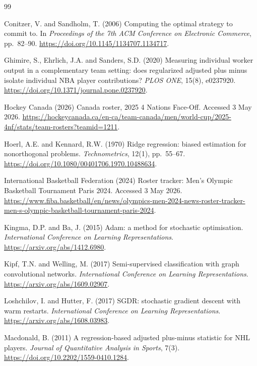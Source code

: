\documentclass[12pt,letterpaper]{article}
\begin{document}
\begin{thebibliography}{99}

Conitzer, V. and Sandholm, T. (2006)
Computing the optimal strategy to commit to.
In \textit{Proceedings of the 7th ACM Conference on Electronic
Commerce}, pp.\ 82--90.
\url{https://doi.org/10.1145/1134707.1134717}.

Ghimire, S., Ehrlich, J.A. and Sanders, S.D. (2020)
Measuring individual worker output in a complementary team setting:
does regularized adjusted plus minus isolate individual NBA player
contributions?
\textit{PLOS ONE}, 15(8), e0237920.
\url{https://doi.org/10.1371/journal.pone.0237920}.

Hockey Canada (2026)
Canada roster, 2025 4 Nations Face-Off.
Accessed 3 May 2026.
\url{https://hockeycanada.ca/en-ca/team-canada/men/world-cup/2025-4nf/stats/team-rosters?teamid=1211}.

Hoerl, A.E. and Kennard, R.W. (1970)
Ridge regression: biased estimation for nonorthogonal problems.
\textit{Technometrics}, 12(1), pp.\ 55--67.
\url{https://doi.org/10.1080/00401706.1970.10488634}.

International Basketball Federation (2024)
Roster tracker: Men's Olympic Basketball Tournament Paris 2024.
Accessed 3 May 2026.
\url{https://www.fiba.basketball/en/news/olympics-men-2024-news-roster-tracker-men-s-olympic-basketball-tournament-paris-2024}.

Kingma, D.P. and Ba, J. (2015)
Adam: a method for stochastic optimisation.
\textit{International Conference on Learning Representations}.
\url{https://arxiv.org/abs/1412.6980}.

Kipf, T.N. and Welling, M. (2017)
Semi-supervised classification with graph convolutional networks.
\textit{International Conference on Learning Representations}.
\url{https://arxiv.org/abs/1609.02907}.

Loshchilov, I. and Hutter, F. (2017)
SGDR: stochastic gradient descent with warm restarts.
\textit{International Conference on Learning Representations}.
\url{https://arxiv.org/abs/1608.03983}.

Macdonald, B. (2011)
A regression-based adjusted plus-minus statistic for NHL players.
\textit{Journal of Quantitative Analysis in Sports}, 7(3).
\url{https://doi.org/10.2202/1559-0410.1284}.


\end{thebibliography}
\end{document}
